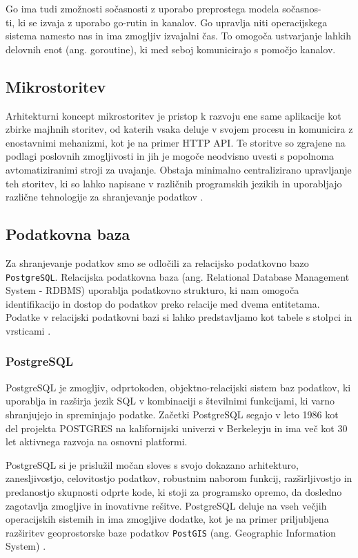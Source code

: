 \documentclass[a4paper, 12pt]{book}
\begin{document}
Go ima tudi zmožnosti sočasnosti z uporabo preprostega modela sočasnos-\\ti, ki se izvaja z uporabo go-rutin in kanalov. Go upravlja niti operacijskega sistema namesto nas in ima zmogljiv izvajalni čas. To omogoča ustvarjanje lahkih delovnih enot (ang. goroutine), ki med seboj komunicirajo s pomočjo kanalov.

\subsection{Mikrostoritev}
Arhitekturni koncept mikrostoritev je pristop k razvoju ene same aplikacije kot zbirke majhnih storitev, od katerih vsaka deluje v svojem procesu in komunicira z enostavnimi mehanizmi, kot je na primer HTTP API. Te storitve so zgrajene na podlagi poslovnih zmogljivosti in jih je mogoče neodvisno uvesti s popolnoma avtomatiziranimi stroji za uvajanje. Obstaja minimalno centralizirano upravljanje teh storitev, ki so lahko napisane v različnih programskih jezikih in uporabljajo različne tehnologije za shranjevanje podatkov \cite{mfowler-microservices}.


\subsection{Podatkovna baza}
Za shranjevanje podatkov smo se odločili za relacijsko podatkovno bazo \verb=PostgreSQL=. Relacijska podatkovna baza (ang. Relational Database Management System - RDBMS) uporablja podatkovno strukturo, ki nam omogoča identifikacijo in dostop do podatkov preko relacije med dvema entitetama. Podatke v relacijski podatkovni bazi si lahko predstavljamo kot tabele s stolpci in vrsticami \cite{oracle-rdbms}.


\subsubsection{PostgreSQL}
PostgreSQL je zmogljiv, odprtokoden, objektno-relacijski sistem baz podatkov, ki uporablja in razširja jezik SQL v kombinaciji s številnimi funkcijami, ki varno shranjujejo in spreminjajo podatke. Začetki PostgreSQL segajo v leto 1986 kot del projekta POSTGRES na kalifornijski univerzi v Berkeleyju in ima več kot 30 let aktivnega razvoja na osnovni platformi.

PostgreSQL si je prislužil močan sloves s svojo dokazano arhitekturo, zanesljivostjo, celovitostjo podatkov, robustnim naborom funkcij, razširljivostjo in predanostjo skupnosti odprte kode, ki stoji za programsko opremo, da dosledno zagotavlja zmogljive in inovativne rešitve.
PostgreSQL deluje na vseh večjih operacijskih sistemih in ima zmogljive dodatke, kot je na primer priljubljena razširitev geoprostorske baze podatkov \verb=PostGIS= (ang. Geographic Information System) \cite{pg-database-postgis}.
\end{document}
